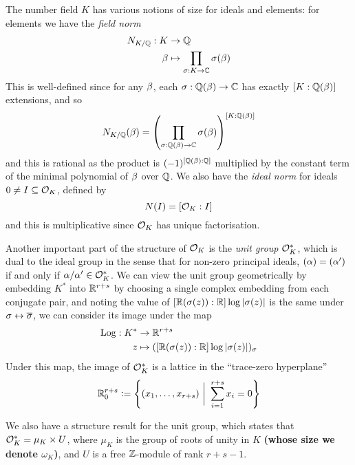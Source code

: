 \documentclass[11pt]{report}
\begin{document}
The number field $K$ has various notions of size for ideals and elements: for elements we have the \emph{field norm}
\begin{align*}
    N_{K / \mathbb{Q}} : K &\to \mathbb{Q} \\
    \beta &\mapsto \prod_{\sigma : K \to \mathbb{C}}\sigma(\beta)
\end{align*}
This is well-defined since for any $\beta$, each $\sigma : \mathbb{Q}(\beta) \to \mathbb{C}$ has exactly $[K : \mathbb{Q}(\beta)]$ extensions, and so
$$
    N_{K / \mathbb{Q}}(\beta) = \left(  \prod_{\sigma : \mathbb{Q}(\beta) \to \mathbb{C}}\sigma(\beta)  \right)^{[K : \mathbb{Q}(\beta)]}
$$
and this is rational as the product is $(-1)^{[\mathbb{Q}(\beta) : \mathbb{Q}]}$ multiplied by the constant term of the minimal polynomial of $\beta$ over $\mathbb{Q}$. We also have the \emph{ideal norm} for ideals $0 \neq I \subseteq \mathcal{O}_K$, defined by 
$$
    N(I) = [\mathcal{O}_K : I]
$$
and this is multiplicative since $\mathcal{O}_K$ has unique factorisation.


Another important part of the structure of $\mathcal{O}_K$ is the \emph{unit group} $\mathcal{O}_K^*$, which is dual to the ideal group in the sense that for non-zero principal ideals, $(\alpha) = (\alpha')$ if and only if $\alpha/\alpha' \in \mathcal{O}_K^*$. We can view the unit group geometrically by embedding $K^*$ into $\mathbb{R}^{r + s}$ by choosing a single complex embedding from each conjugate pair, and noting the value of $[\mathbb{R}(\sigma(z)) : \mathbb{R}]\log\left| \sigma(z) \right|$ is the same under $\sigma \leftrightarrow \overline{\sigma}$, we can consider its image under the map
\begin{align*}
    \operatorname{Log} : K^* &\to \mathbb{R}^{r + s} \\
    z &\mapsto ([\mathbb{R}(\sigma(z)) : \mathbb{R}]\log\left| \sigma(z) \right|)_{\sigma}
\end{align*}
Under this map, the image of $\mathcal{O}_K^*$ is a lattice in the ``trace-zero hyperplane''
$$
    \mathbb{R}_0^{r + s} \vcentcolon= \left\{  (x_1, \ldots, x_{r + s}) \ \bigg| \ \sum_{i = 1}^{r + s}x_i = 0  \right\}
$$

We also have a structure result for the unit group, which states that $\mathcal{O}_K^* = \mu_K \times U$, where $\mu_K$ is the group of roots of unity in $K$ \textbf{(whose size we denote $\omega_K$)}, and $U$ is a free $\mathbb{Z}$-module of rank $r + s - 1$.
\end{document}
